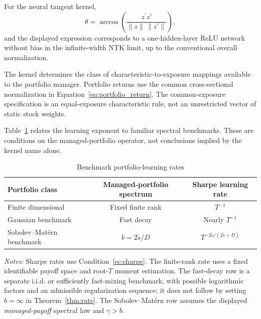 \begin{table}[H]
\begin{minipage}{0.97\textwidth}
For the neural tangent kernel,
\[
\theta
=
\arccos\!\left(
\frac{z^\prime z'}
{\|z\|\,\|z'\|}
\right),
\]
and the displayed expression corresponds to a one-hidden-layer ReLU network
without bias in the infinite-width NTK limit, up to the conventional overall
normalization.

The kernel determines the class of characteristic-to-exposure mappings
available to the portfolio manager. Portfolio returns use the common
cross-sectional normalization in Equation~\eqref{eq:portfolio_return}.
The common-exposure specification is an equal-exposure characteristic rule,
not an unrestricted vector of static stock weights.
\end{minipage}
\end{table}


Table~\ref{tab:special-rates} relates the learning exponent to familiar
spectral benchmarks. These are conditions on the managed-portfolio operator,
not conclusions implied by the kernel name alone.

\begin{table}[H]
\centering
\caption{Benchmark portfolio-learning rates}
\label{tab:special-rates}
\small
\begin{tabular}{lcc}
\toprule
Portfolio class
&
Managed-portfolio spectrum
&
Sharpe learning rate
\\
\midrule
Finite dimensional
&
Fixed finite rank
&
$T^{-1}$
\\[5pt]

Gaussian benchmark
&
Fast decay
&
Nearly $T^{-1}$
\\[5pt]

Sobolev--Mat\'ern benchmark
&
$b=2\widetilde s/D$
&
$T^{-2\widetilde s/(2\widetilde s+D)}$
\\
\bottomrule
\end{tabular}

\par\smallskip
\begin{minipage}{0.97\textwidth}
\footnotesize
\emph{Notes:} Sharpe rates use Condition~\ref{ec:sharpe}.
The finite-rank rate uses a fixed identifiable payoff space and root-$T$
moment estimation. The fast-decay row is a separate i.i.d. or sufficiently
fast-mixing benchmark, with possible logarithmic factors and an admissible
regularization sequence; it does not follow by setting $b=\infty$ in
Theorem~\ref{thm:rate}. The Sobolev--Mat\'ern row assumes the displayed
\emph{managed-payoff} spectral law and $\gamma>b$.
\end{minipage}
\end{table}
